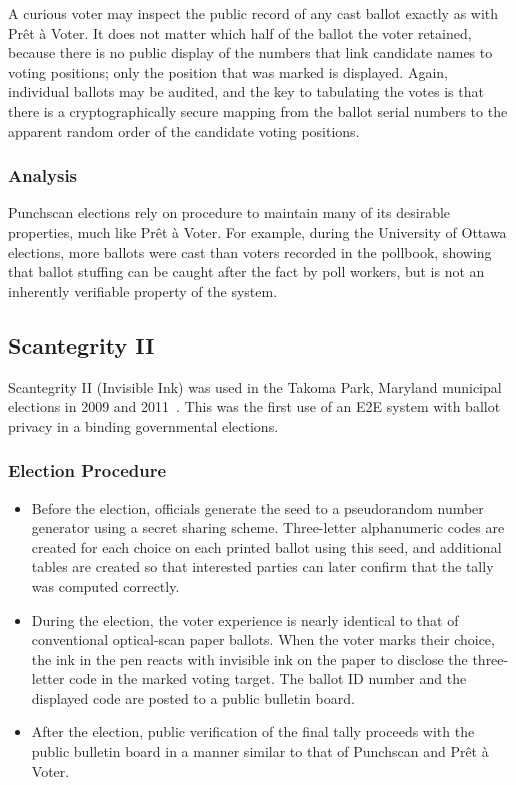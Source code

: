 A curious voter may inspect the public record of any cast ballot
exactly as with Prêt à Voter. It does not matter which half of the
ballot the voter retained, because there is no public display of the
numbers that link candidate names to voting positions; only the
position that was marked is displayed. Again, individual ballots may
be audited, and the key to tabulating the votes is that there is a
cryptographically secure mapping from the ballot serial numbers to the
apparent random order of the candidate voting positions.

\subsubsection{Analysis}

Punchscan elections rely on procedure to maintain many of its
desirable properties, much like Prêt à Voter. For example, during the
University of Ottawa elections, more ballots were cast than voters
recorded in the pollbook, showing that ballot stuffing can be caught
after the fact by poll workers, but is not an inherently verifiable
property of the system.


\subsection{Scantegrity II~\cite{chaum2008,chaum2009}}

Scantegrity II (Invisible Ink) was used in the Takoma Park, Maryland
municipal elections in 2009 and 2011~\cite{carback2010}. This was the
first use of an E2E system with ballot privacy in a binding
governmental elections.

\subsubsection{Election Procedure}

\begin{itemize}

\item Before the election, officials generate the seed to a
  pseudorandom number generator using a secret sharing
  scheme. Three-letter alphanumeric codes are created for each choice
  on each printed ballot using this seed, and additional tables are
  created so that interested parties can later confirm that the tally
  was computed correctly.

\item During the election, the voter experience is nearly identical to
  that of conventional optical-scan paper ballots. When the voter
  marks their choice, the ink in the pen reacts with invisible ink on
  the paper to disclose the three-letter code in the marked voting
  target. The ballot ID number and the displayed code are posted to a
  public bulletin board.

\item After the election, public verification of the final tally
  proceeds with the public bulletin board in a manner similar to that
  of Punchscan and Prêt à Voter.

\end{itemize}

